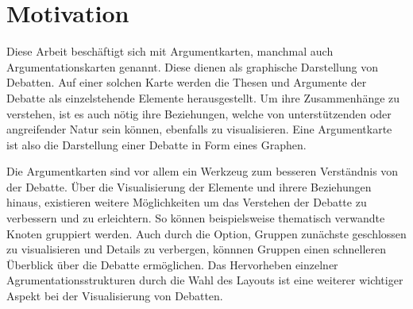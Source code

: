 %

\chapter{Motivation}
Diese Arbeit beschäftigt sich mit Argumentkarten, manchmal auch Argumentationskarten genannt. Diese dienen als graphische Darstellung von Debatten. 
Auf einer solchen Karte werden die Thesen und Argumente der Debatte als einzelstehende Elemente herausgestellt. 
Um ihre Zusammenhänge zu verstehen, ist es auch nötig ihre Beziehungen, welche von unterstützenden oder angreifender Natur sein können, ebenfalls zu visualisieren.
Eine Argumentkarte ist also die Darstellung einer Debatte in Form eines Graphen.


Die Argumentkarten sind vor allem ein Werkzeug zum besseren Verständnis von der Debatte. 
Über die Visualisierung der Elemente und ihrere Beziehungen hinaus, existieren weitere Möglichkeiten um das Verstehen der Debatte zu verbessern und zu erleichtern.
So können beispielsweise thematisch verwandte Knoten gruppiert werden. 
Auch durch die Option, Gruppen zunächste geschlossen zu visualisieren und Details zu verbergen, könnnen Gruppen einen schnelleren Überblick über die Debatte ermöglichen.
Das Hervorheben einzelner Agrumentationsstrukturen durch die Wahl des Layouts ist eine weiterer wichtiger Aspekt bei der Visualisierung von Debatten.

